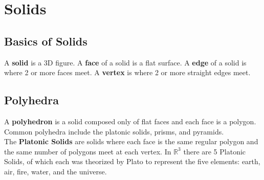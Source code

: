 \section{Solids}

    \subsection{Basics of Solids}
        A \textbf{solid} is a 3D figure. A \textbf{face} of a solid is a flat surface. A
        \textbf{edge} of a solid is where 2 or more faces meet. A \textbf{vertex} is where 2 or
        more straight edges meet. \\



    \subsection{Polyhedra}
        \noindent A \textbf{polyhedron} is a solid composed only of flat faces and each face is
        a polygon. Common polyhedra include the platonic solids, prisms, and pyramids. \\

        \noindent The \textbf{Platonic Solids} are solids where each face is the same regular
        polygon and the same number of polygons meet at each vertex. In $\mathbb{R}^3$ there are
        5 Platonic Solids, of which each was theorized by Plato to represent the five elements:
        earth, air, fire, water, and the universe. \\

